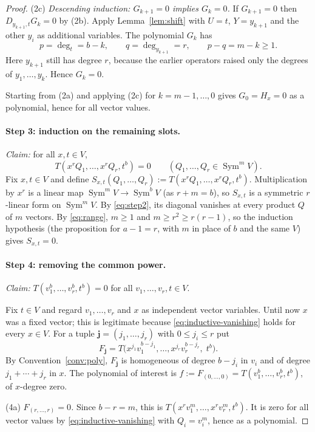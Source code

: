 \documentclass[11pt]{article}
\theoremstyle{definition}
\theoremstyle{remark}
\DeclareMathOperator{\Sym}{Sym}
\newcommand{\D}[2]{D_{#1,#2}}
\begin{document}
\begin{proof}
(2c) \emph{Descending induction: $G_{k+1}=0$ implies $G_k=0$.} If
$G_{k+1}=0$ then $\D{y_{k+1}}{t}G_k=0$ by (2b). Apply
Lemma~\ref{lem:shift} with $U=t$, $Y=y_{k+1}$ and the other $y_i$ as
additional variables. The polynomial $G_k$ has
\[
 p=\deg_t=b-k,\qquad q=\deg_{y_{k+1}}=r,\qquad p-q=m-k\ge1.
\]
Here $y_{k+1}$ still has degree $r$, because the earlier operators raised
only the degrees of $y_1,\ldots,y_k$. Hence $G_k=0$.

Starting from (2a) and applying (2c) for $k=m-1,\ldots,0$ gives
$G_0=H_x=0$ as a polynomial, hence for all vector values.

\paragraph{Step 3: induction on the remaining slots.}
\emph{Claim:} for all $x,t\in V$,
\begin{equation}\label{eq:inductive-vanishing}
 T(x^rQ_1,\ldots,x^rQ_r,t^b)=0
 \qquad(Q_1,\ldots,Q_r\in\Sym^m V).
\end{equation}
Fix $x,t\in V$ and define
$S_{x,t}(Q_1,\ldots,Q_r):=T(x^rQ_1,\ldots,x^rQ_r,t^b)$. Multiplication by
$x^r$ is a linear map $\Sym^mV\to\Sym^bV$ (as $r+m=b$), so $S_{x,t}$ is a
symmetric $r$-linear form on $\Sym^mV$. By \eqref{eq:step2}, its diagonal
vanishes at every product $Q$ of $m$ vectors. By \eqref{eq:range},
$m\ge1$ and $m\ge r^2\ge r(r-1)$, so the induction hypothesis (the
proposition for $a-1=r$, with $m$ in place of $b$ and the same $V$) gives
$S_{x,t}=0$.

\paragraph{Step 4: removing the common power.}
\emph{Claim:} $T(v_1^b,\ldots,v_r^b,t^b)=0$ for all
$v_1,\ldots,v_r,t\in V$.

Fix $t\in V$ and regard $v_1,\ldots,v_r$ and $x$ as independent vector
variables. Until now $x$ was a fixed vector; this is legitimate because
\eqref{eq:inductive-vanishing} holds for every $x\in V$. For a tuple
$\mathbf j=(j_1,\ldots,j_r)$ with $0\le j_i\le r$ put
\[
 F_{\mathbf j}=T\bigl(x^{j_1}v_1^{b-j_1},\ldots,x^{j_r}v_r^{b-j_r},\;t^b\bigr).
\]
By Convention~\ref{conv:poly}, $F_{\mathbf j}$ is homogeneous of degree
$b-j_i$ in $v_i$ and of degree $j_1+\cdots+j_r$ in $x$. The polynomial of
interest is $f:=F_{(0,\ldots,0)}=T(v_1^b,\ldots,v_r^b,t^b)$, of $x$-degree
zero.

(4a) \emph{$F_{(r,\ldots,r)}=0$.} Since $b-r=m$, this is
$T(x^rv_1^m,\ldots,x^rv_r^m,t^b)$. It is zero for all vector values by
\eqref{eq:inductive-vanishing} with $Q_i=v_i^m$, hence as a polynomial.


\end{proof}
\end{document}
